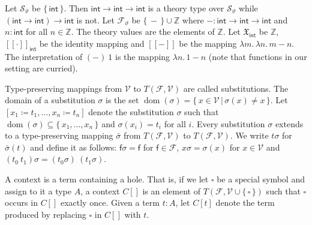\documentclass[10pt,a4paper]{amsart}
\providecommand{\coloneq}{\coloneqq}
\begin{document}
 
Let ${\mathcal{S}}_{\vartheta}$ be $\{\,\mathsf{int}\,\}$. Then $\mathsf{int}\rightarrow\mathsf{int}\rightarrow\mathsf{int}$ is a theory type over ${\mathcal{S}}_{\vartheta}$ while $(\mathsf{int}\rightarrow\mathsf{int})\rightarrow\mathsf{int}$ is not. Let ${\mathcal{F}}_{\vartheta}$ be $\{\,-\,\}\cup\mathbb{Z}$ where ${-}:\mathsf{int}\rightarrow\mathsf{int}\rightarrow\mathsf{int}$ and $n:\mathsf{int}$ for all $n\in\mathbb{Z}$. The theory values are the elements of $\mathbb{Z}$. Let $\mathfrak{X}_{\mathsf{int}}$ be $\mathbb{Z}$, $[\![\cdot]\!]_{\mathsf{int}}$ be the identity mapping and $[\![-]\!]$ be the mapping $\lambda{m}.\,\lambda{n}.\,m-n$. The interpretation of ${(-)}\ {1}$ is the mapping $\lambda{n}.\,1-n$ (note that functions in our setting are curried).\par
 
 
 
 
Type-preserving mappings from $\mathcal{V}$ to $T(\mathcal{F},\mathcal{V})$ are called substitutions. The domain of a substitution $\sigma$ is the set $\operatorname{dom}(\sigma)=\{\,x\in\mathcal{V}\,|\,\sigma(x)\neq x\,\}$. Let $[{x_{1}}\coloneq{t_{1}},\ldots,{x_{n}}\coloneq{t_{n}}]$ denote the substitution $\sigma$ such that $\operatorname{dom}(\sigma)\subseteq\{\,{x}_{1},\ldots,{x}_{n}\,\}$ and $\sigma(x_{i})=t_{i}$ for all $i$. Every substitution $\sigma$ extends to a type-preserving mapping $\bar{\sigma}$ from $T(\mathcal{F},\mathcal{V})$ to $T(\mathcal{F},\mathcal{V})$. We write $t\sigma$ for $\bar{\sigma}(t)$ and define it as follows: $\mathsf{f}\sigma=\mathsf{f}$ for $\mathsf{f}\in\mathcal{F}$, $x\sigma=\sigma(x)$ for $x\in\mathcal{V}$ and $({t_{0}}\ {t_{1}})\sigma={(t_{0}\sigma)}\ {(t_{1}\sigma)}$.\par
 
 
 
A context is a term containing a hole. That is, if we let $\square$ be a special symbol and assign to it a type $A$, a context ${C}[]$ is an element of $T(\mathcal{F},\mathcal{V}\cup\{\,\square\,\})$ such that $\square$ occurs in ${C}[]$ exactly once. Given a term $t:A$, let ${C}[t]$ denote the term produced by replacing $\square$ in ${C}[]$ with $t$.\par
 
\end{document}
